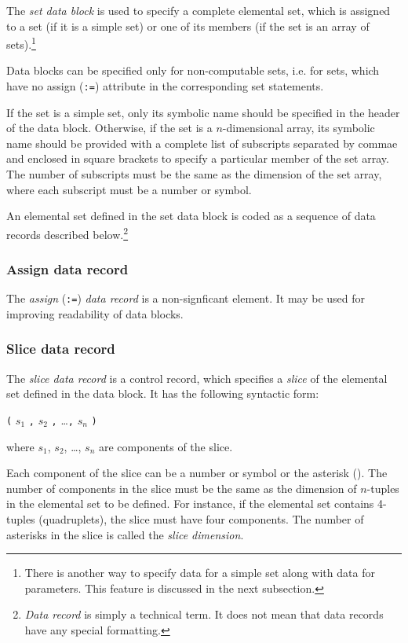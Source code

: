 \documentclass[10pt]{article}
\begin{document}
\medskip

The {\it set data block} is used to specify a complete elemental set,
which is assigned to a set (if it is a simple set) or one of its
members (if the set is an array of sets).\footnote{There is another way
to specify data for a simple set along with data for parameters. This
feature is discussed in the next subsection.}

Data blocks can be specified only for non-computable sets, i.e. for
sets, which have no assign ({\tt:=}) attribute in the corresponding set
statements.

If the set is a simple set, only its symbolic name should be specified
in the header of the data block. Otherwise, if the set is a
$n$-dimensional array, its symbolic name should be provided with a
complete list of subscripts separated by commae and enclosed in square
brackets to specify a particular member of the set array. The number of
subscripts must be the same as the dimension of the set array, where
each subscript must be a number or symbol.

An elemental set defined in the set data block is coded as a sequence
of data records described below.\footnote{{\it Data record} is simply a
technical term. It does not mean that data records have any special
formatting.}

\newpage

\subsubsection{Assign data record}

The {\it assign} ({\tt:=}) {\it data record} is a non-signficant
element. It may be used for improving readability of data blocks.

\subsubsection{Slice data record}

The {\it slice data record} is a control record, which specifies a
{\it slice} of the elemental set defined in the data block. It has the
following syntactic form:

\medskip

\noindent\hfil
{\tt(} $s_1$ {\tt,} $s_2$ {\tt,} \dots {\tt,} $s_n$ {\tt)}

\medskip

\noindent where $s_1$, $s_2$, \dots, $s_n$ are components of the slice.

Each component of the slice can be a number or symbol or the asterisk
({\tt*}). The number of components in the slice must be the same as the
dimension of $n$-tuples in the elemental set to be defined. For
instance, if the elemental set contains 4-tuples (quadruplets), the
slice must have four components. The number of asterisks in the slice
is called the {\it slice dimension}.
\end{document}
